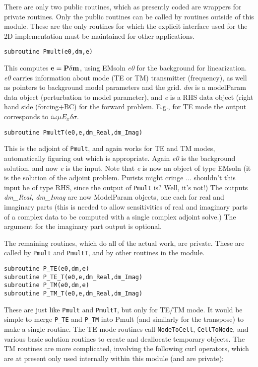 \documentclass[12pt]{article}
\begin{document}
There are only two public routines, which as presently coded are
wrappers for private routines.  Only the public routines can be
called by routines outside of this module.  These are the only
routines for which the explicit interface used for the 2D
implementation must be maintained for other applications.

\begin{verbatim}
subroutine Pmult(e0,dm,e)
\end{verbatim}

This computes ${\bf e} = {\bf P}\delta {\bf m}$,
using EMsoln {\it e0} for the background
for linearization.  {\it e0} carries information about mode (TE or TM)
transmitter (frequency), as well as pointers to background model 
parameters and the grid.  {\it dm} is a modelParam data object (perturbation
to model parameter), and {\it e} is a RHS data object (right hand side
(forcing+BC) for the forward problem.  E.g., for TE mode the
output corresponds to $i \omega \mu E_x \delta \sigma$.

\begin{verbatim}
subroutine PmultT(e0,e,dm_Real,dm_Imag)
\end{verbatim}

This is the adjoint of \verb|Pmult|, and again works for TE and
TM modes, automatically figuring out which is appropriate.
Again {\it e0} is the background solution, and now {\it e} is the input.
Note that {\it e} is now an object of type EMsoln (it is the solution
of the adjoint problem.  Purists might cringe ... shouldn't this
input be of type RHS, since the output of \verb|Pmult| is? Well, it's not!)  
The outputs {\it dm\_Real, dm\_Imag}
are now ModelParam objects, one each for real and
imaginary parts (this is needed to allow sensitivities of real
and imaginary parts of a complex data to be computed with a
single complex adjoint solve.)  The argument for
the imaginary part output is optional.

The remaining routines, which do all of the actual work, are private.
These are called by \verb|Pmult| and \verb|PmultT|, and by other routines in
the module.

\begin{verbatim}
subroutine P_TE(e0,dm,e)
subroutine P_TE_T(e0,e,dm_Real,dm_Imag)
subroutine P_TM(e0,dm,e)
subroutine P_TM_T(e0,e,dm_Real,dm_Imag)
\end{verbatim}

These are just like \verb|Pmult| and \verb|PmultT|, but only for TE/TM mode.
It would be simple to merge \verb|P_TE| and \verb|P_TM|
into Pmult (and similarly for the transpose) to make a single routine.
The TE mode routines call \verb|NodeToCell|, \verb|CellToNode|, and various
basic solution routines to create and deallocate temporary objects.
The TM routines are more complicated, involving the following 
curl operators, which are at present only used internally within
this module (and are private):
\end{document}
